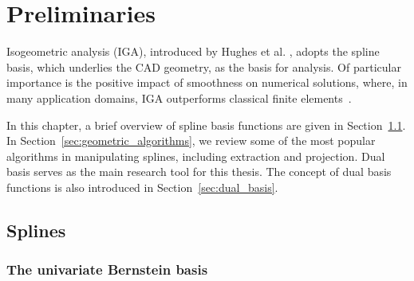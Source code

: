 \chapter{Preliminaries}
\label{chp:chapter2}
\graphicspath{{figures/}{figures/chapter2/}}

Isogeometric analysis (IGA), introduced by Hughes et al. \cite{HUGHES20054135}, adopts the spline basis, which underlies the CAD geometry, as the basis for analysis. Of particular importance is the positive impact of smoothness on numerical solutions, where, in many application domains, IGA outperforms classical finite elements~\cite{cottrell2009isogeometric,cottrell_studies_2007,cottrell2006isogeometric,hughes_duality_2008,bazilevs_isogeometric_2010,evans_n-widths_2009}.

In this chapter, a brief overview of spline basis functions are given in Section~\ref{sec:spline_overview}. In Section~\ref{sec:geometric_algorithms}, we review some of the most popular algorithms in manipulating splines, including \Bezier extraction and \Bezier projection. Dual basis serves as the main research tool for this thesis. The concept of dual basis functions is also introduced in Section~\ref{sec:dual_basis}.

\section{Splines}\label{sec:spline_overview}

\subsection{The univariate Bernstein basis}

